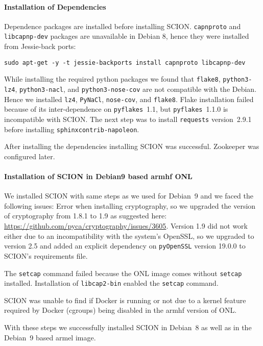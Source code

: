 \documentclass[a4paper]{article}
\begin{document}
\paragraph{Installation of Dependencies}
Dependence packages are installed before installing SCION. \texttt{capnproto} and \texttt{libcapnp-dev} packages are unavailable in Debian 8, hence they were installed from Jessie-back ports:
\begin{lstlisting}
sudo apt-get -y -t jessie-backports install capnproto libcapnp-dev
\end{lstlisting}

While installing the required python packages we found that \texttt{flake8}, \texttt{python3-lz4}, \texttt{python3-nacl}, and \texttt{python3-nose-cov} are not compatible with the Debian. Hence we installed \texttt{lz4}, \texttt{PyNaCl}, \texttt{nose-cov}, and \texttt{flake8}. Flake installation failed because of its inter-dependence on \texttt{pyflakes}~1.1, but \texttt{pyflakes}~1.1.0 is incompatible with SCION. The next step was to install \texttt{requests} version~2.9.1 before installing \texttt{sphinxcontrib-napoleon}.

After installing the dependencies installing SCION was successful. Zookeeper was configured later.

\paragraph{Installation of SCION in Debian9 based armhf ONL}
We installed SCION with same steps as we used for Debian~9 and we faced the following issues: Error when installing cryptography, so we upgraded the version of cryptography from 1.8.1 to 1.9 as suggested here: \url{https://github.com/pyca/cryptography/issues/3605}. Version 1.9 did not work either due to an incompatibility with the system's OpenSSL, so we upgraded to version 2.5 and added an explicit dependency on \texttt{pyOpenSSL} version 19.0.0 to SCION's requirements file.

The \texttt{setcap} command failed because the ONL image comes without \texttt{setcap} installed. Installation of \texttt{libcap2-bin} enabled the \texttt{setcap} command.

SCION was unable to find if Docker is running or not due to a kernel feature required by Docker (cgroups) being disabled in the armhf version of ONL.

With these steps we successfully installed SCION in Debian~8 as well as in the Debian~9 based armel image.
\end{document}
